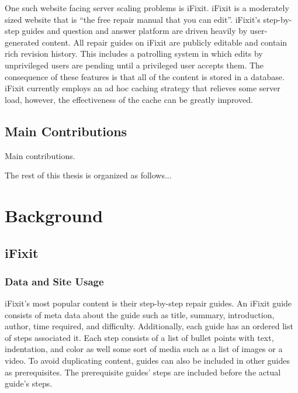\documentclass[12pt]{ucthesis}
\begin{document}
One such website facing server scaling problems is {\textsf iFixit}.
{\textsf iFixit} is a moderately sized website that is ``the free repair manual that you can edit''\cite{ifixitDotCom}.
{\textsf iFixit}'s step-by-step guides and question and answer platform are driven heavily by user-generated content.
All repair guides on iFixit are publicly editable and contain rich revision history.
This includes a patrolling system in which edits by unprivileged users are pending until a privileged user accepts them.
The consequence of these features is that all of the content is stored in a database.
{\textsf iFixit} currently employs an ad hoc caching strategy that relieves some server load, however, the effectiveness of the cache can be greatly improved.


\section{Main Contributions}
Main contributions.

The rest of this thesis is organized as follows...


\chapter{Background}
\label{background}


\section{iFixit}
\subsection{Data and Site Usage}
iFixit's most popular content is their step-by-step repair guides.
An iFixit guide consists of meta data about the guide such as title, summary, introduction, author, time required, and difficulty.
Additionally, each guide has an ordered list of steps associated it.
Each step consists of a list of bullet points with text, indentation, and color as well some sort of media such as a list of images or a video.
To avoid duplicating content, guides can also be included in other guides as prerequisites.
The prerequisite guides' steps are included before the actual guide's steps.
\end{document}
